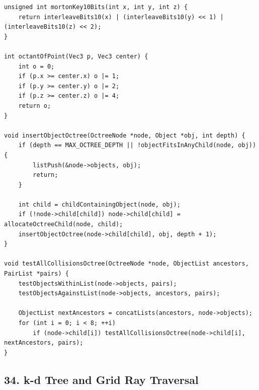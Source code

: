 \documentclass[10pt,letterpaper]{article}
\begin{document}
\begin{verbatim}
unsigned int mortonKey10Bits(int x, int y, int z) {
    return interleaveBits10(x) | (interleaveBits10(y) << 1) | (interleaveBits10(z) << 2);
}

int octantOfPoint(Vec3 p, Vec3 center) {
    int o = 0;
    if (p.x >= center.x) o |= 1;
    if (p.y >= center.y) o |= 2;
    if (p.z >= center.z) o |= 4;
    return o;
}

void insertObjectOctree(OctreeNode *node, Object *obj, int depth) {
    if (depth == MAX_OCTREE_DEPTH || !objectFitsInAnyChild(node, obj)) {
        listPush(&node->objects, obj);
        return;
    }

    int child = childContainingObject(node, obj);
    if (!node->child[child]) node->child[child] = allocateOctreeChild(node, child);
    insertObjectOctree(node->child[child], obj, depth + 1);
}

void testAllCollisionsOctree(OctreeNode *node, ObjectList ancestors, PairList *pairs) {
    testObjectsWithinList(node->objects, pairs);
    testObjectsAgainstList(node->objects, ancestors, pairs);

    ObjectList nextAncestors = concatLists(ancestors, node->objects);
    for (int i = 0; i < 8; ++i)
        if (node->child[i]) testAllCollisionsOctree(node->child[i], nextAncestors, pairs);
}
\end{verbatim}


\subsection*{34. k-d Tree and Grid Ray Traversal}
\end{document}
